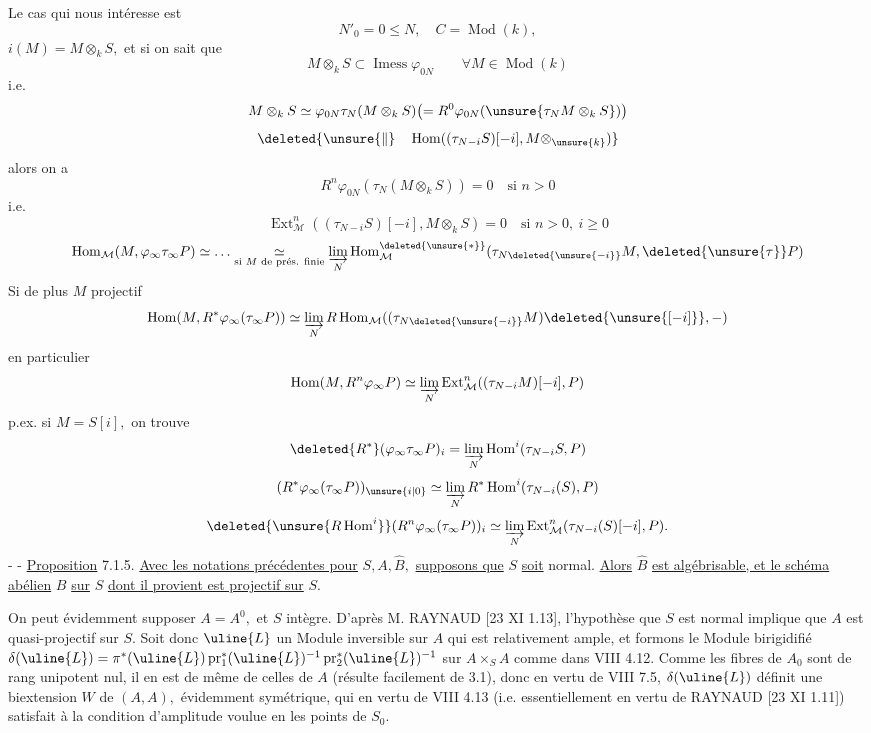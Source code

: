 Le cas qui nous intéresse est
\[
N'_0=0\leq N,\quad C=\operatorname{Mod}(k),
\]
\(i(M)=M\otimes_k S,\) et si on sait que
\[
M\otimes_k S\subset\operatorname{Imess}\varphi_{0N}\qquad\forall M\in\operatorname{Mod}(k)
\]
i.e.
\[
M\otimes_k S\simeq\varphi_{0N}\tau_N(M\otimes_k S)
\bigl(=R^0\varphi_{0N}(\unsure{\tau_N M\otimes_k S})\bigr)
\]
\[
\deleted{\unsure{\Vert}\quad\operatorname{Hom}((\tau_{N-i}S)[-i],M\otimes_{\unsure{k}})}
\]
alors on a
\[
R^n\varphi_{0N}(\tau_N(M\otimes_k S))=0\quad\text{si }n>0
\]
i.e.
\[
\boxed{\operatorname{Ext}^n_{\mathcal M}((\tau_{N-i}S)[-i],M\otimes_k S)=0\quad\text{si }n>0,\ i\geq0}
\]
\[
\operatorname{Hom}_{\mathcal M}(M,\varphi_\infty\tau_\infty P)\simeq\ldots
\underset{\text{si }M\text{ de prés. finie}}{\simeq}
\varinjlim_N\operatorname{Hom}_{\mathcal M}^{\deleted{\unsure{*}}}(\tau_{N\deleted{\unsure{-i}}}M,\deleted{\unsure{\tau}}P)
\]
Si de plus \(M\) projectif
\[
\operatorname{Hom}(M,R^*\varphi_\infty(\tau_\infty P))\simeq
\varinjlim_N R\operatorname{Hom}_{\mathcal M}((\tau_{N\deleted{\unsure{-i}}}M)\deleted{\unsure{[-i]}},-)
\]
en particulier
\[
\operatorname{Hom}(M,R^n\varphi_\infty P)\simeq
\varinjlim_N\operatorname{Ext}_{\mathcal M}^n((\tau_{N-i}M)[-i],P)
\]
p.ex. si \(M=S[i],\) on trouve
\[
\deleted{R^*}(\varphi_\infty\tau_\infty P)_i=
\varinjlim_N\operatorname{Hom}^i(\tau_{N-i}S,P)
\]
\[
(R^*\varphi_\infty(\tau_\infty P))_{\unsure{i|0}}\simeq
\varinjlim_N R^*\operatorname{Hom}^i(\tau_{N-i}(S),P)
\]
\[
\deleted{\unsure{R\operatorname{Hom}^i}}
(R^n\varphi_\infty(\tau_\infty P))_i\simeq
\varinjlim_N\operatorname{Ext}_{\mathcal M}^n(\tau_{N-i}(S)[-i],P).
\]
-  -
\uline{Proposition} 7.1.5. \uline{Avec les notations précédentes pour} \(S,A,\hat B,\) \uline{supposons que} \(S\) \uline{soit} normal. \uline{Alors} \(\hat B\) \uline{est algébrisable, et le schéma abélien} \(B\) \uline{sur} \(S\) \uline{dont il provient est projectif sur} \(S.\)

On peut évidemment supposer \(A=A^0,\) et \(S\) intègre. D'après M. RAYNAUD [23 XI 1.13], l'hypothèse que \(S\) est normal implique que \(A\) est quasi-projectif sur \(S.\) Soit donc \(\uline{L}\) un Module inversible sur \(A\) qui est relativement ample, et formons le Module birigidifié
\(\delta(\uline{L})=\pi^*(\uline{L})\operatorname{pr}_1^*(\uline{L})^{-1}\operatorname{pr}_2^*(\uline{L})^{-1}\)
sur \(A\times_S A\) comme dans VIII 4.12. Comme les fibres de \(A_0\) sont de rang unipotent nul, il en est de même de celles de \(A\) (résulte facilement de 3.1), donc en vertu de VIII 7.5, \(\delta(\uline{L})\) définit une biextension \(W\) de \((A,A),\) évidemment symétrique, qui en vertu de VIII 4.13 (i.e. essentiellement en vertu de RAYNAUD [23 XI 1.11]) satisfait à la condition d'amplitude voulue en les points de \(S_0.\)

